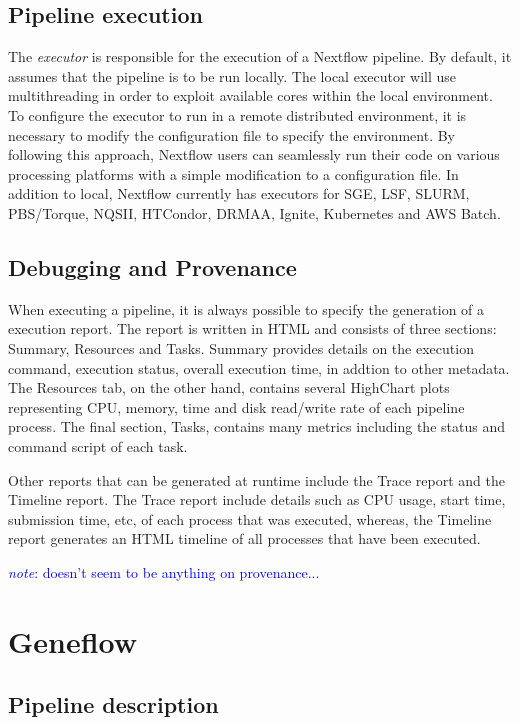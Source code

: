 \documentclass{report}
\newcommand{\note}[1]{\textcolor{blue}{\textit{note}: #1}}
\begin{document}
        \subsection{Pipeline execution} The \textit{executor} is responsible for
        the execution of a Nextflow pipeline. By default, it assumes that the
        pipeline is to be run locally. The local executor will use
        multithreading in order to exploit available cores within the local
        environment. To configure the executor to run in a remote distributed
        environment, it is necessary to modify the configuration file to specify
        the environment. By following this approach, Nextflow users can
        seamlessly run their code on various processing platforms with a simple
        modification to a configuration file. In addition to local, Nextflow
        currently has executors for SGE, LSF, SLURM, PBS/Torque, NQSII,
        HTCondor, DRMAA, Ignite, Kubernetes and AWS Batch.

        \subsection{Debugging and Provenance} When executing a pipeline, it is
        always possible to specify the generation of a execution report. The
        report is written in HTML and consists of three sections: Summary,
        Resources and Tasks. Summary provides details on the execution command,
        execution status, overall execution time, in addtion to other metadata.
        The Resources tab, on the other hand, contains several HighChart plots
        representing CPU, memory, time and disk read/write rate of each pipeline
        process. The final section, Tasks, contains many metrics including the
        status and command script of each task. 

    Other reports that can be generated at runtime include the Trace report and
    the Timeline report. The Trace report include details such as CPU usage,
    start time, submission time, etc, of each process that was executed,
    whereas, the Timeline report generates an HTML timeline of all processes
    that have been executed.        

    \note{doesn't seem to be anything on provenance...}

    \section{Geneflow} 
        \subsection{Pipeline description} 
\end{document}
